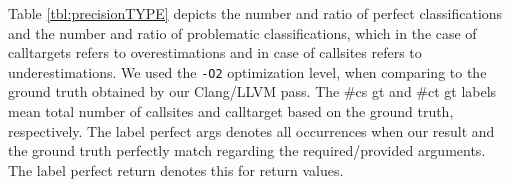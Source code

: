 \begin{table}[H]
	\caption {\textit{type} based policy classification of callsites.
        }
	\label{tbl:precisionTYPE}
\end{table}
Table \ref{tbl:precisionTYPE} depicts the number and ratio of perfect classifications 
and the number and ratio of problematic classifications, which in the case of calltargets refers to overestimations and in case of 
callsites refers to underestimations. We used the \texttt{-O2} optimization level, when comparing to the ground truth obtained by our Clang/LLVM pass.
The \#cs gt and \#ct gt labels mean total number of callsites and calltarget based on the ground truth, respectively.
The label perfect args denotes all occurrences when our result and the ground truth perfectly match regarding the required/provided arguments. The label perfect return denotes this for return values.


